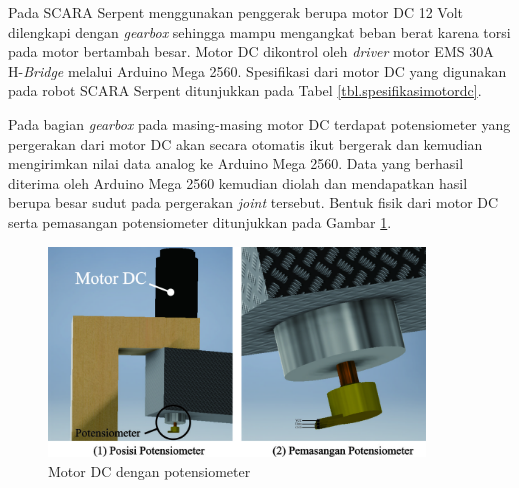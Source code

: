 Pada  SCARA Serpent menggunakan penggerak berupa motor DC 12 Volt dilengkapi dengan \textit{gearbox} sehingga mampu mengangkat beban berat karena torsi pada motor bertambah besar. Motor DC dikontrol oleh \textit{driver} motor EMS 30A H-\textit{Bridge} melalui Arduino Mega 2560. Spesifikasi dari motor DC yang digunakan pada robot SCARA Serpent ditunjukkan pada Tabel \ref{tbl.spesifikasimotordc}.
\begin{table}[H]
	\centering
	\caption{Spesifikasi Motor DC pada Robot SCARA Serpent}
	\label{tbl.spesifikasimotordc}
\end{table}
Pada bagian \textit{gearbox} pada masing-masing motor DC terdapat potensiometer yang pergerakan dari motor DC akan secara otomatis ikut bergerak dan kemudian mengirimkan nilai data analog ke Arduino Mega 2560. Data yang berhasil diterima oleh Arduino Mega 2560 kemudian diolah dan mendapatkan hasil berupa besar sudut pada pergerakan \textit{joint} tersebut. Bentuk fisik dari motor DC serta pemasangan potensiometer ditunjukkan pada Gambar \ref{pic.potensiometer}.
\begin{figure}[H]
	\centering
	\includegraphics[width=10cm]{gambar/potsementara.jpg}
	\caption{Motor DC dengan potensiometer}
	\label{pic.potensiometer}
\end{figure}

